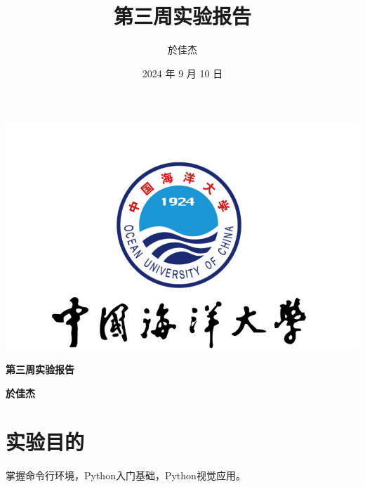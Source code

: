 \documentclass[UTF8]{ctexart}
\begin{document}
\begin{center}
    \includegraphics[width=\textwidth]{o} %
\end{center}

\begin{center}
    \huge\textbf{第三周实验报告}
\end{center}

\begin{center}
    \huge\textbf{於佳杰}
\end{center}
\newpage
\title{第三周实验报告}
\author{於佳杰}
\date{2024 年 9 月 10 日}
\maketitle
{}
\tableofcontents
\newpage



\pagestyle{fancy}
\fancyhf{}
\renewcommand{\headrulewidth}{1pt}
\renewcommand{\footrulewidth}{1pt}
\fancyhead[C]{\rightmark}
\fancyfoot[C]{\thepage}
\fancyhead[R]{\thepage}








\section{实验目的}
{\color{red}掌握命令行环境，Python入门基础，Python视觉应用。}
\end{document}
